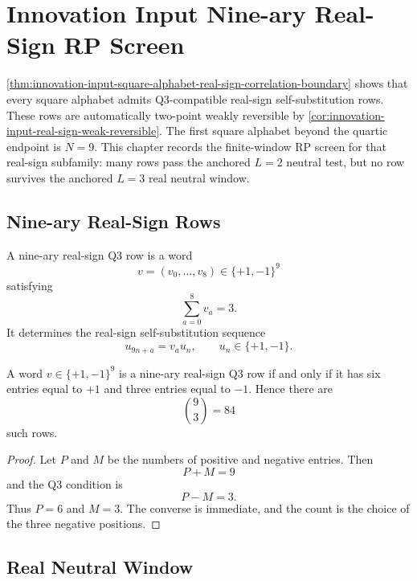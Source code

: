 \chapter{Innovation Input Nine-ary Real-Sign RP Screen}
\label{ch:visions-innovation-input-nine-real-sign-rp-screen}

\autoref{thm:innovation-input-square-alphabet-real-sign-correlation-boundary}
shows that every square alphabet admits Q3-compatible real-sign
self-substitution rows. These rows are automatically two-point weakly
reversible by \autoref{cor:innovation-input-real-sign-weak-reversible}.
The first square alphabet beyond the quartic endpoint is $N=9$. This
chapter records the finite-window RP screen for that real-sign subfamily:
many rows pass the anchored $L=2$ neutral test, but no row survives the
anchored $L=3$ real neutral window.

\section{Nine-ary Real-Sign Rows}
\label{sec:innovation-input-nine-real-sign-rows}

\begin{definition}
\label{def:innovation-input-nine-real-sign-qthree-row}
A nine-ary real-sign Q3 row is a word
$$
v=(v_0,\ldots,v_8)\in\{+1,-1\}^9
$$
satisfying
$$
\sum_{a=0}^{8}v_a=3.
$$
It determines the real-sign self-substitution sequence
$$
u_{9n+a}=v_a u_n,
\qquad
u_n\in\{+1,-1\}.
$$
\end{definition}

\begin{proposition}
\label{prop:innovation-input-nine-real-sign-count}
A word $v\in\{+1,-1\}^9$ is a nine-ary real-sign Q3 row if and only if it
has six entries equal to $+1$ and three entries equal to $-1$. Hence there
are
$$
\binom93=84
$$
such rows.
\end{proposition}

\begin{proof}
Let $P$ and $M$ be the numbers of positive and negative entries. Then
$$
P+M=9
$$
and the Q3 condition is
$$
P-M=3.
$$
Thus $P=6$ and $M=3$. The converse is immediate, and the count is the
choice of the three negative positions.
\end{proof}

\section{Real Neutral Window}
\label{sec:innovation-input-nine-real-neutral-window}

